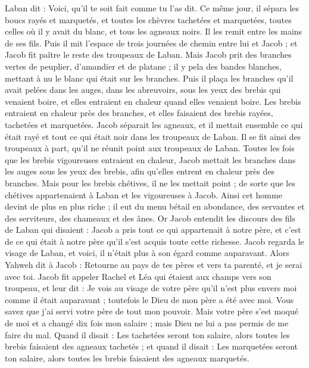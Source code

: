 \begin{multicols}{2}
Laban dit : Voici, qu'il te soit fait comme tu l'as dit.
Ce même jour, il sépara les boucs rayés et marquetés, et toutes les chèvres tachetées et marquetées, toutes celles où il y avait du blanc, et tous les agneaux noirs. Il les remit entre les mains de ses fils.
Puis il mit l'espace de trois journées de chemin entre lui et Jacob ; et Jacob fit paître le reste des troupeaux de Laban.
Mais Jacob prit des branches vertes de peuplier, d’amandier et de platane ; il y pela des bandes blanches,  mettant à nu le blanc qui était sur les branches.
Puis il plaça les branches qu’il avait pelées dans les auges, dans les abreuvoirs, sous les yeux des brebis qui venaient boire, et elles entraient en chaleur quand elles venaient boire.
Les brebis entraient en chaleur près des branches, et elles faisaient des brebis rayées, tachetées et marquetées.
Jacob séparait les agneaux, et il mettait ensemble ce qui était rayé et tout ce qui était noir dans les troupeaux de Laban. Il se fit ainsi des troupeaux à part, qu’il ne réunit point aux troupeaux de Laban.
Toutes les fois que les brebis vigoureuses entraient en chaleur, Jacob mettait les branches dans les auges sous les yeux des brebis, afin qu'elles entrent en chaleur près des  branches.
Mais pour les brebis chétives, il ne les mettait point ; de sorte que les chétives appartenaient à Laban et les vigoureuses à Jacob.
Ainsi cet homme devint de plus en plus riche ; il eut du menu bétail en abondance, des servantes et des serviteurs, des chameaux et des ânes.
\VerseOne{}Or Jacob entendit les discours des fils de Laban qui disaient : Jacob a pris tout ce qui appartenait à notre père, et c’est de ce qui était à notre père qu’il s’est acquis toute cette richesse.
Jacob regarda le visage de Laban, et voici, il n'était plus à son égard comme auparavant.
Alors Yahweh dit à Jacob : Retourne au pays de tes pères et vers ta parenté, et je serai avec toi.
Jacob fit appeler Rachel et Léa qui étaient aux champs vers son troupeau,
et leur dit : Je vois au visage de votre père qu'il n'est plus envers moi comme il était auparavant ; toutefois le Dieu de mon père a été avec moi.
Vous savez que j'ai servi votre père de tout mon pouvoir.
Mais votre père s'est moqué de moi et a changé dix fois mon salaire ; mais Dieu ne lui a pas permis de me faire du mal.
Quand il disait : Les tachetées seront ton salaire, alors toutes les brebis faisaient des agneaux tachetés ; et quand il disait : Les marquetées seront ton salaire, alors toutes les brebis faisaient des agneaux marquetés.

\end{multicols}
